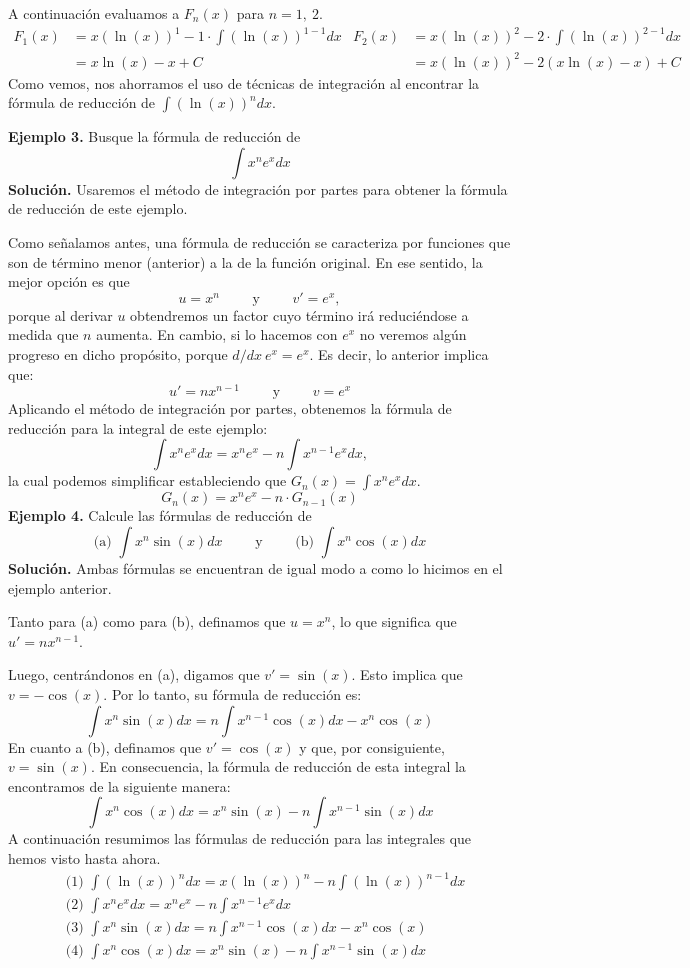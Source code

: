 \documentclass[12pt]{article}
\begin{document}
A continuación evaluamos a $F_{n}(x)$ para $n = {1, \ 2}$.
\begin{align*}
  F_{1}(x) &= x (\ln(x))^{1} - 1 \cdot \int (\ln(x))^{1 - 1} dx & F_{2}(x) &= x (\ln(x))^{2} - 2 \cdot \int (\ln(x))^{2 - 1} dx \\
           &= x \ln(x) - x + C                                  &          &= x (\ln(x))^{2} - 2 (x \ln(x) - x) + C
\end{align*}
Como vemos, nos ahorramos el uso de técnicas de integración al encontrar la fórmula de reducción de $\int (\ln(x))^{n} dx$.

\textbf{Ejemplo 3.} Busque la fórmula de reducción de
\[
  \int x^{n} e^{x} dx
\]
\textbf{Solución.} Usaremos el método de integración por partes para obtener la fórmula de reducción de este ejemplo.

Como señalamos antes, una fórmula de reducción se caracteriza por funciones que son de término menor (anterior) a la de la función original. En ese sentido, la mejor opción es que
\[
  u = x^{n} \qquad \text{ y } \qquad v' = e^{x},
\]
porque al derivar $u$ obtendremos un factor cuyo término irá reduciéndose a medida que $n$ aumenta. En cambio, si lo hacemos con $e^{x}$ no veremos algún progreso en dicho propósito, porque $d/dx \ e^{x} = e^{x}$. Es decir, lo anterior implica que:
\[
  u' = nx^{n - 1} \qquad \text{ y } \qquad v = e^{x}
\]
Aplicando el método de integración por partes, obtenemos la fórmula de reducción para la integral de este ejemplo:
\[
  \int x^{n} e^{x} dx = x^{n} e^{x} - n \int x^{n - 1} e^{x} dx,
\]
la cual podemos simplificar estableciendo que $G_{n}(x) = \int x^{n} e^{x} dx$.
\[
  G_{n}(x) = x^{n} e^{x} - n \cdot G_{n - 1}(x)
\]
\textbf{Ejemplo 4.} Calcule las fórmulas de reducción de
\[
  \text{(a) } \int x^{n} \sin(x) dx \qquad \text{ y } \qquad \text{(b) } \int x^{n} \cos(x) dx
\]
\textbf{Solución.} Ambas fórmulas se encuentran de igual modo a como lo hicimos en el ejemplo anterior.

Tanto para (a) como para (b), definamos que $u = x^{n}$, lo que significa que $u' = n x^{n - 1}$.

Luego, centrándonos en (a), digamos que $v' = \sin(x)$. Esto implica que $v = - \cos(x)$. Por lo tanto, su fórmula de reducción es:
\[
  \int x^{n} \sin(x) dx = n \int x^{n - 1} \cos(x) dx - x^{n} \cos(x)
\]
En cuanto a (b), definamos que $v' = \cos(x)$ y que, por consiguiente, $v = \sin(x)$. En consecuencia, la fórmula de reducción de esta integral la encontramos de la siguiente manera:
\[
  \int x^{n} \cos(x) dx = x^{n} \sin(x) - n \int x^{n - 1} \sin(x) dx
\]
A continuación resumimos las fórmulas de reducción para las integrales que hemos visto hasta ahora.
\begin{align*}
  &\text{(1) } \int (\ln(x))^{n}dx = x (\ln(x))^{n} - n \int (\ln(x))^{n - 1} dx \\
  &\text{(2) } \int x^{n} e^{x} dx = x^{n} e^{x} - n \int x^{n - 1} e^{x} dx \\
  &\text{(3) } \int x^{n} \sin(x) dx = n \int x^{n - 1} \cos(x) dx - x^{n} \cos(x) \\
  &\text{(4) } \int x^{n} \cos(x) dx = x^{n} \sin(x) - n \int x^{n - 1} \sin(x) dx
\end{align*}
\end{document}
